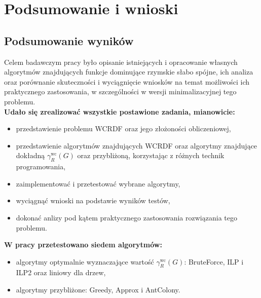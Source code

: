 \chapter{Podsumowanie i wnioski}

\section{Podsumowanie wyników}

Celem badawczym pracy było opisanie istniejących i opracowanie własnych algorytmów znajdujących funkcje dominujące rzymskie słabo spójne, ich analiza oraz porównanie skuteczności i wyciągnięcie wniosków na temat możliwości ich praktycznego zastosowania, w szczególności w wersji minimalizacyjnej tego problemu.\\
\textbf{Udało się zrealizować wszystkie postawione zadania, mianowicie:}
\begin{itemize}
    \item przedstawienie problemu WCRDF oraz jego złożoności obliczeniowej,
    \item przedstawienie algorytmów znajdujących WCRDF oraz algorytmy znajdujące dokładną  $\gamma^{\text{wc}}_R(G)$ oraz przybliżoną, korzystając z różnych technik programowania,
    \item zaimplementować i przetestować wybrane algorytmy,
    \item wyciągnąć wnioski na podstawie wyników testów,
    \item dokonać anlizy pod kątem praktycznego zastosowania rozwiązania tego problemu.
\end{itemize}

\textbf{W pracy przetestowano siedem algorytmów:}
\begin{itemize}
    \item algorytmy optymalnie wyznaczające wartość $\gamma^{\text{wc}}_R(G)$: BruteForce, ILP i ILP2 oraz liniowy dla drzew,
    \item algorytmy przybliżone: Greedy, Approx i AntColony.
\end{itemize}

